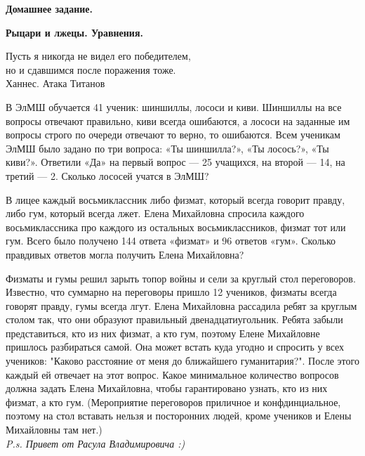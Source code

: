 \centerline{\bf \Huge Домашнее задание.}
\centerline{\bf \Huge Рыцари и лжецы. Уравнения.}

\begin{flushright}
        \scriptsize{Пусть я никогда не видел его победителем,\\ но и сдавшимся после поражения тоже. \\Ханнес. Атака Титанов}
\end{flushright}

В ЭлМШ обучается 41 ученик: шиншиллы, лососи и киви. Шиншиллы на все вопросы отвечают правильно, киви всегда ошибаются, а лососи на заданные им вопросы строго по очереди отвечают то верно, то ошибаются. Всем ученикам ЭлМШ было задано по три вопроса: «Ты шиншилла?», «Ты лосось?», «Ты киви?». Ответили «Да» на первый вопрос — 25 учащихся, на второй — 14, на третий — 2. Сколько лососей учатся в ЭлМШ?

В лицее каждый восьмиклассник либо физмат, который всегда говорит правду, либо гум, который всегда лжет. Елена Михайловна спросила каждого восьмиклассника про каждого из остальных восьмиклассников, физмат тот или гум. Всего было получено 144 ответа «физмат» и 96 ответов «гум». Сколько правдивых ответов могла получить Елена Михайловна?

 Физматы и гумы решил зарыть топор войны и сели за круглый стол переговоров. Известно, что суммарно на переговоры пришло 12 учеников, физматы всегда говорят правду, гумы всегда лгут. Елена Михайловна рассадила ребят за круглым столом так, что они образуют правильный двенадцатиугольник. Ребята забыли представиться, кто из них физмат, а кто гум, поэтому Елене Михайловне пришлось разбираться самой. Она может встать куда угодно и спросить у всех учеников: "Каково расстояние от меня до ближайшего гуманитария?". После этого каждый ей отвечает на этот вопрос. Какое минимальное количество вопросов должна задать Елена Михайловна, чтобы гарантировано узнать, кто из них физмат, а кто гум. (Мероприятие переговоров приличное и конфдинциальное, поэтому на стол вставать нельзя и посторонних людей, кроме учеников и Елены Михайловны там нет.) \\
\textit{P.s. Привет от Расула Владимировича :)}
